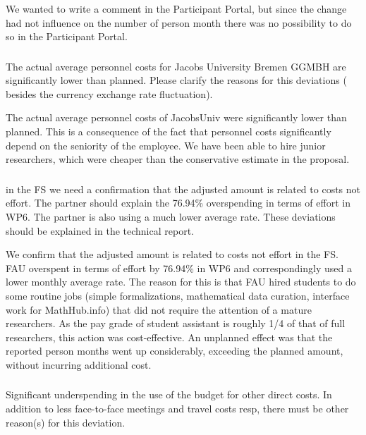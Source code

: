 We wanted to write a comment in the Participant Portal, but since the change had not influence on the number of person month there was no possibility to do so in the Participant Portal.

\subsubsection{}

\begin{EUcomment}
  The actual average personnel costs for Jacobs University Bremen GGMBH are significantly lower than planned. Please
  clarify the reasons for this deviations ( besides the currency exchange rate fluctuation).
\end{EUcomment}

The actual average personnel costs of JacobsUniv were significantly
lower than planned. This is a consequence of the fact that personnel
costs significantly depend on the seniority of the employee. We have
been able to hire junior researchers, which were cheaper than the
conservative estimate in the proposal.

\subsubsection{}

\begin{EUcomment}
in the FS we need a confirmation that the adjusted amount is related to costs not effort. 
The partner should explain the 76.94\% overspending in terms of effort in WP6. The partner is
also using a much lower average rate. These deviations should be explained in the technical report.
\end{EUcomment}

We confirm that the adjusted amount is related to costs not effort in the FS.
FAU overspent in terms of effort by 76.94\% in WP6 and correspondingly used a lower monthly
average rate. The reason for this is that FAU hired students to do some routine jobs
(simple formalizations, mathematical data curation, interface work for MathHub.info) that
did not require the attention of a mature researchers. As the pay grade of student
assistant is roughly 1/4 of that of full researchers, this action was cost-effective. An
unplanned effect was that the reported person months went up considerably, exceeding the
planned amount, without incurring additional cost.


\subsubsection{}
\begin{EUcomment}
  Significant underspending in the use of the budget for other direct
  costs. In addition to less face-to-face meetings and travel costs
  resp, there must be other reason(s) for this deviation.
\end{EUcomment}

